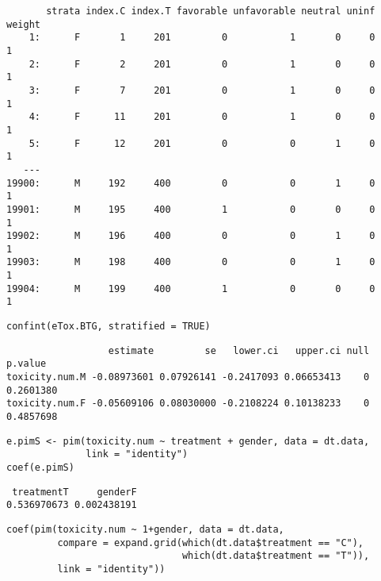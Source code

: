\documentclass[12pt]{article}
\begin{document}
\begin{verbatim}
       strata index.C index.T favorable unfavorable neutral uninf weight
    1:      F       1     201         0           1       0     0      1
    2:      F       2     201         0           1       0     0      1
    3:      F       7     201         0           1       0     0      1
    4:      F      11     201         0           1       0     0      1
    5:      F      12     201         0           0       1     0      1
   ---                                                                  
19900:      M     192     400         0           0       1     0      1
19901:      M     195     400         1           0       0     0      1
19902:      M     196     400         0           0       1     0      1
19903:      M     198     400         0           0       1     0      1
19904:      M     199     400         1           0       0     0      1
\end{verbatim}


\lstset{language=r,label= ,caption= ,captionpos=b,numbers=none}
\begin{lstlisting}
confint(eTox.BTG, stratified = TRUE)
\end{lstlisting}

\begin{verbatim}
                  estimate         se   lower.ci   upper.ci null   p.value
toxicity.num.M -0.08973601 0.07926141 -0.2417093 0.06653413    0 0.2601380
toxicity.num.F -0.05609106 0.08030000 -0.2108224 0.10138233    0 0.4857698
\end{verbatim}


\lstset{language=r,label= ,caption= ,captionpos=b,numbers=none}
\begin{lstlisting}
e.pimS <- pim(toxicity.num ~ treatment + gender, data = dt.data,
              link = "identity")
coef(e.pimS)
\end{lstlisting}

\begin{verbatim}
 treatmentT     genderF 
0.536970673 0.002438191
\end{verbatim}


\lstset{language=r,label= ,caption= ,captionpos=b,numbers=none}
\begin{lstlisting}
coef(pim(toxicity.num ~ 1+gender, data = dt.data,
         compare = expand.grid(which(dt.data$treatment == "C"),
                               which(dt.data$treatment == "T")),
         link = "identity"))

\end{lstlisting}
\end{document}
